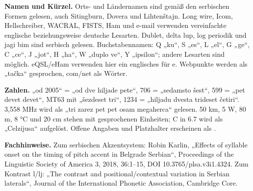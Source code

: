 \documentclass[a4paper,landscape,10pt]{article}
\newcommand{\ipa}[1]{{\ipafont[#1]}}
\begin{document}
\smallskip
\textbf{Namen und Kürzel.} Orts- und Ländernamen sind gemäß den serbischen Formen gelesen,
auch Sitingburn, Dovera und Lihtenštajn. Long wire, Icom, Hellschreiber, WACRAL, FISTS, Ham und e-mail
verwenden vereinfachte englische beziehungsweise deutsche Lesarten.
Dublet, delta lup, log periodik und jagi bim sind serbisch gelesen.
Buchstabennamen: Q „ku“, S „es“, L „el“, G „ge“, C „ce“, J „jot“, H „ha“, W „duplo ve“, Y „ipsilon“;
andere Lesarten sind möglich. eQSL/eHam verwenden hier ein englisches \ipa{i} für e.
Webpunkte werden als „tačka“ gesprochen, com/net als Wörter.

\smallskip
\textbf{Zahlen.} „od 2005“ = „od dve hiljade pete“, 706 = „sedamsto šest“,
599 = „pet devet devet“, MT63 mit „šezdeset tri“, 1234 = „hiljadu dvesta trideset četiri“.
3,558 MHz wird als „tri zarez pet pet osam megaherca“ gelesen.
50 km, 5 W, 80 m, 8 °C und 20 cm stehen mit gesprochenen Einheiten;
C in 6.7 wird als „Celzijusa“ aufgelöst. Offene Angaben und Platzhalter erscheinen als \ipa{…}.

\smallskip
\textbf{Fachhinweise.} Zum serbischen Akzentsystem: Robin Karlin,
„Effects of syllable onset on the timing of pitch accent in Belgrade Serbian“,
Proceedings of the Linguistic Society of America 3, 2018, 36:1--15, DOI 10.3765/plsa.v3i1.4324.
Zum Kontrast l/lj: „The contrast and positional/contextual variation in Serbian laterals“,
Journal of the International Phonetic Association, Cambridge Core.
\end{document}
